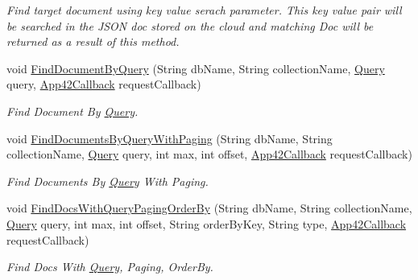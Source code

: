 \begin{DoxyCompactItemize}
\begin{DoxyCompactList}\small\item\em Find target document using key value serach parameter. This key value pair will be searched in the J\+S\+O\+N doc stored on the cloud and matching Doc will be returned as a result of this method. \end{DoxyCompactList}\item 
void \hyperlink{classcom_1_1shephertz_1_1app42_1_1paas_1_1sdk_1_1windows_1_1storage_1_1_storage_service_a11662c93b4e6e4f236386a5f70d5e7ef}{Find\+Document\+By\+Query} (String db\+Name, String collection\+Name, \hyperlink{classcom_1_1shephertz_1_1app42_1_1paas_1_1sdk_1_1windows_1_1storage_1_1_query}{Query} query, \hyperlink{interfacecom_1_1shephertz_1_1app42_1_1paas_1_1sdk_1_1windows_1_1_app42_callback}{App42\+Callback} request\+Callback)
\begin{DoxyCompactList}\small\item\em Find Document By \hyperlink{classcom_1_1shephertz_1_1app42_1_1paas_1_1sdk_1_1windows_1_1storage_1_1_query}{Query}. \end{DoxyCompactList}\item 
void \hyperlink{classcom_1_1shephertz_1_1app42_1_1paas_1_1sdk_1_1windows_1_1storage_1_1_storage_service_a9290237e25a622160027508bc4121d01}{Find\+Documents\+By\+Query\+With\+Paging} (String db\+Name, String collection\+Name, \hyperlink{classcom_1_1shephertz_1_1app42_1_1paas_1_1sdk_1_1windows_1_1storage_1_1_query}{Query} query, int max, int offset, \hyperlink{interfacecom_1_1shephertz_1_1app42_1_1paas_1_1sdk_1_1windows_1_1_app42_callback}{App42\+Callback} request\+Callback)
\begin{DoxyCompactList}\small\item\em Find Documents By \hyperlink{classcom_1_1shephertz_1_1app42_1_1paas_1_1sdk_1_1windows_1_1storage_1_1_query}{Query} With Paging. \end{DoxyCompactList}\item 
void \hyperlink{classcom_1_1shephertz_1_1app42_1_1paas_1_1sdk_1_1windows_1_1storage_1_1_storage_service_abe12540ddb8fa8e95c89fe3bab1d6f75}{Find\+Docs\+With\+Query\+Paging\+Order\+By} (String db\+Name, String collection\+Name, \hyperlink{classcom_1_1shephertz_1_1app42_1_1paas_1_1sdk_1_1windows_1_1storage_1_1_query}{Query} query, int max, int offset, String order\+By\+Key, String type, \hyperlink{interfacecom_1_1shephertz_1_1app42_1_1paas_1_1sdk_1_1windows_1_1_app42_callback}{App42\+Callback} request\+Callback)
\begin{DoxyCompactList}\small\item\em Find Docs With \hyperlink{classcom_1_1shephertz_1_1app42_1_1paas_1_1sdk_1_1windows_1_1storage_1_1_query}{Query}, Paging, Order\+By. \end{DoxyCompactList}\item 

\end{DoxyCompactItemize}
